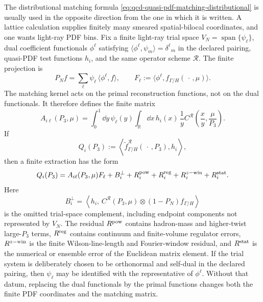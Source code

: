 \begin{controlledapproximation}
\label{ca:qcd-quasi-pdf-finite-momentum-inverse-matching}
The distributional matching formula
\eqref{eq:qcd-quasi-pdf-matching-distributional} is usually used in the
opposite direction from the one in which it is written.  A lattice calculation
supplies finitely many smeared spatial-bilocal coordinates, and one wants
light-ray PDF bins.  Fix a finite light-ray trial space
\(V_N=\operatorname{span}\{\psi_\ell\}\), dual coefficient functionals
\(\phi^\ell\) satisfying
\(\langle\phi^\ell,\psi_m\rangle=\delta^\ell{}_m\) in the declared pairing,
quasi-PDF test functions \(h_i\), and the same operator scheme
\(\mathcal R\).  The finite projection is
\[
  P_N f=\sum_\ell \psi_\ell\,\langle\phi^\ell,f\rangle,
  \qquad
  F_\ell:=\langle\phi^\ell,f_{\Gamma/H}(\,\cdot\,,\mu)\rangle .
\]
The matching kernel acts on the primal reconstruction functions, not on the
dual functionals.  It therefore defines the finite matrix
\[
  A_{i\ell}(P_3,\mu)
  =
  \int_0^1\dd y\,\psi_\ell(y)
  \int_{\mathbb R}\dd x\,h_i(x)\,
  \frac1y
  C^{\mathcal R}\!\left(\frac{x}{y},\frac{\mu}{P_3}\right).
\]
If
\[
  Q_i(P_3)
  :=
  \left\langle
    \widetilde f_{\Gamma/H}^{\mathcal R}(\,\cdot\,,P_3),h_i
  \right\rangle,
\]
then a finite extraction has the form
\begin{equation}
  Q_i(P_3)
  =
  A_{i\ell}(P_3,\mu)F_\ell
  +B_i^{\perp}
  +R_i^{\rm pow}
  +R_i^{\rm reg}
  +R_i^{z{\rm -win}}
  +R_i^{\rm stat}.
  \label{eq:qcd-quasi-pdf-finite-inverse-data}
\end{equation}
Here
\[
  B_i^\perp
  =
  \left\langle
    h_i,\,
    C^{\mathcal R}(P_3,\mu)\otimes(1-P_N)f_{\Gamma/H}
  \right\rangle
\]
is the omitted trial-space complement, including endpoint components not
represented by \(V_N\).  The residual \(R^{\rm pow}\) contains hadron-mass and
higher-twist large-\(P_3\) terms, \(R^{\rm reg}\) contains continuum and
finite-volume regulator errors, \(R^{z{\rm -win}}\) is the finite
Wilson-line-length and Fourier-window residual, and \(R^{\rm stat}\) is the
numerical or ensemble error of the Euclidean matrix element.  If the trial
system is deliberately chosen to be orthonormal and self-dual in the declared
pairing, then \(\psi_\ell\) may be identified with the representative of
\(\phi^\ell\).  Without that datum, replacing the dual functionals by the
primal functions changes both the finite PDF coordinates and the matching
matrix.


\end{controlledapproximation}
